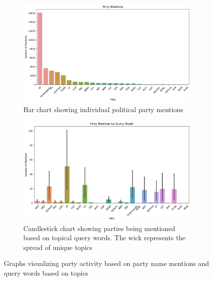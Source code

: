 \begin{figure}[ht]
  \centering
  \begin{subfigure}[h]{.49\linewidth}
    \includegraphics[width=\textwidth]{media/party-mentions.jpeg}
    \captionsetup{justification=centering}
    \caption{Bar chart showing individual political party mentions}
    \label{fig:partymentions}
  \end{subfigure}
  \begin{subfigure}[h]{.49\linewidth}
      \captionsetup{justification=centering}
      \includegraphics[width=\textwidth]{media/party-mentions-query-words.jpeg}
      \caption{Candlestick chart showing parties being mentioned based on topical query words. The wick represents the spread of unique topics}
      \label{fig:partycandle}
  \end{subfigure}
  \caption{Graphs visualizing party activity based on party name mentions and query words based on topics}
  \label{fig:results}
\end{figure}

